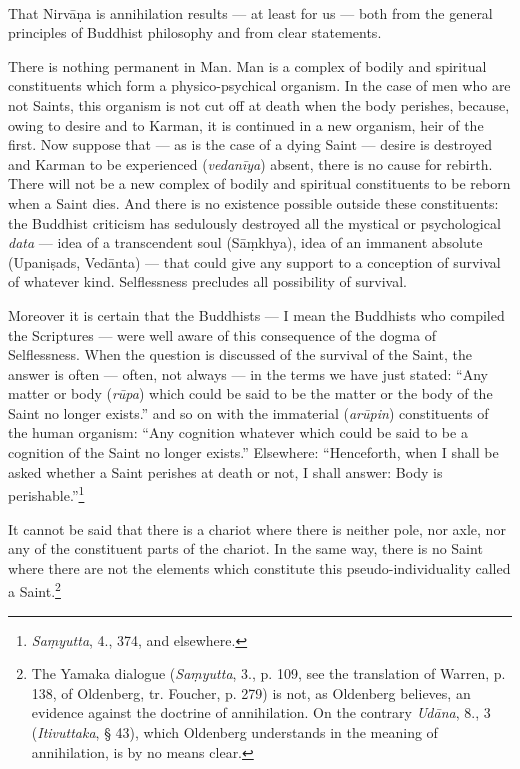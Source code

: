 \documentclass[a4paper, 11pt, oneside, english, landscape]{article}
\begin{document}
\paragraph{}
That Nirvāṇa is annihilation results --- at least for us --- both from the general principles of Buddhist philosophy and from clear statements.

There is nothing permanent in Man. Man is a complex of bodily and spiritual constituents which form a physico-psychical organism. In the case of men who are not Saints, this organism is not cut off at death when the body perishes, because, owing to desire and to Karman, it is continued in a new organism, heir of the first. Now suppose that --- as is the case of a dying Saint --- desire is destroyed and Karman to be experienced (\emph{vedanīya}) absent, there is no cause for rebirth. There will not be a new complex of bodily and spiritual constituents to be reborn when a Saint dies. And there is no existence possible outside these constituents: the Buddhist criticism has sedulously destroyed all the mystical or psychological \emph{data} --- idea of a transcendent soul (Sāṃkhya), idea of an immanent absolute (Upaniṣads, Vedānta) --- that could give any support to a conception of survival of whatever kind. Selflessness precludes all possibility of survival.

Moreover it is certain that the Buddhists --- I mean the Buddhists who compiled the Scriptures --- were well aware of this consequence of the dogma of Selflessness. When the question is discussed of the survival of the Saint, the answer is often --- often, not always --- in the terms we have just stated: ``Any matter or body (\emph{rūpa}) which could be said to be the matter or the body of the Saint no longer exists.'' and so on with the immaterial (\emph{arūpin}) constituents of the human organism: ``Any cognition whatever which could be said to be a cognition of the Saint no longer exists.'' Elsewhere: ``Henceforth, when I shall be asked whether a Saint perishes at death or not, I shall answer: Body is perishable.''\footnote{\emph{Saṃyutta}, 4., 374, and elsewhere.}

It cannot be said that there is a chariot where there is neither pole, nor axle, nor any of the constituent parts of the chariot. In the same way, there is no Saint where there are not the elements which constitute this pseudo-individuality called a Saint.\footnote{The Yamaka dialogue (\emph{Saṃyutta}, 3., p. 109, see the translation of Warren, p. 138, of Oldenberg, tr. Foucher, p. 279) is not, as Oldenberg believes, an evidence against the doctrine of annihilation. On the contrary \emph{Udāna}, 8., 3 (\emph{Itivuttaka}, § 43), which Oldenberg understands in the meaning of annihilation, is by no means clear.}
\end{document}
